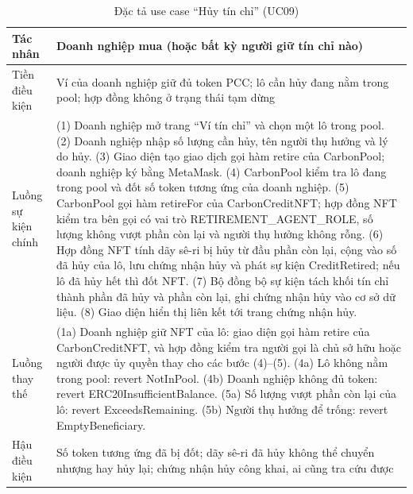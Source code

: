 \begin{table}[!htbp]
    \centering
    \caption{Đặc tả use case ``Hủy tín chỉ'' (UC09)}
    \label{tab:dt-uc09}
    \small
    \begin{tabularx}{\textwidth}{|L{2.8cm}|Y|}
        \hline
        Tác nhân & Doanh nghiệp mua (hoặc bất kỳ người giữ tín chỉ nào) \\
        \hline
        Tiền điều kiện & Ví của doanh nghiệp giữ đủ token PCC; lô cần hủy đang nằm trong pool; hợp đồng không ở trạng thái tạm dừng \\
        \hline
        Luồng sự kiện chính & (1) Doanh nghiệp mở trang ``Ví tín chỉ'' và chọn một lô trong pool.\newline
        (2) Doanh nghiệp nhập số lượng cần hủy, tên người thụ hưởng và lý do hủy.\newline
        (3) Giao diện tạo giao dịch gọi hàm retire của CarbonPool; doanh nghiệp ký bằng MetaMask.\newline
        (4) CarbonPool kiểm tra lô đang trong pool và đốt số token tương ứng của doanh nghiệp.\newline
        (5) CarbonPool gọi hàm retireFor của CarbonCreditNFT; hợp đồng NFT kiểm tra bên gọi có vai trò RETIREMENT\_AGENT\_ROLE, số lượng không vượt phần còn lại và người thụ hưởng không rỗng.\newline
        (6) Hợp đồng NFT tính dãy sê-ri bị hủy từ đầu phần còn lại, cộng vào số đã hủy của lô, lưu chứng nhận hủy và phát sự kiện CreditRetired; nếu lô đã hủy hết thì đốt NFT.\newline
        (7) Bộ đồng bộ sự kiện tách khối tín chỉ thành phần đã hủy và phần còn lại, ghi chứng nhận hủy vào cơ sở dữ liệu.\newline
        (8) Giao diện hiển thị liên kết tới trang chứng nhận hủy. \\
        \hline
        Luồng thay thế & (1a) Doanh nghiệp giữ NFT của lô: giao diện gọi hàm retire của CarbonCreditNFT, và hợp đồng kiểm tra người gọi là chủ sở hữu hoặc người được ủy quyền thay cho các bước (4)–(5).\newline
        (4a) Lô không nằm trong pool: revert NotInPool.\newline
        (4b) Doanh nghiệp không đủ token: revert ERC20InsufficientBalance.\newline
        (5a) Số lượng vượt phần còn lại của lô: revert ExceedsRemaining.\newline
        (5b) Người thụ hưởng để trống: revert EmptyBeneficiary. \\
        \hline
        Hậu điều kiện & Số token tương ứng đã bị đốt; dãy sê-ri đã hủy không thể chuyển nhượng hay hủy lại; chứng nhận hủy công khai, ai cũng tra cứu được \\
        \hline
    \end{tabularx}
\end{table}

